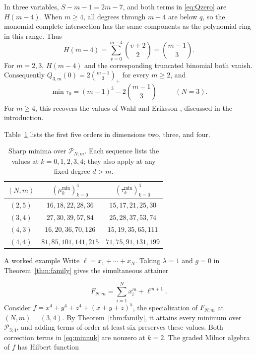 \documentclass[12pt,reqno]{amsart}
\makeatletter
\renewcommand\subsection{\@startsection{subsection}{2}%
  \z@{.8\linespacing\@plus.3\linespacing}{.35\linespacing}%
  {\normalfont\bfseries}}
\newcommand{\tbin}[2]{\binom{#1}{#2}_{\!+}}
\newcommand{\Pall}{\mathcal P_{N;m}}
\theoremstyle{definition}
\makeatother
\begin{document}
In three variables, $S-m-1=2m-7$, and both terms in
\eqref{eq:Qzero} are $H(m-4)$. When $m\geq4$, all degrees through
$m-4$ are below $q$, so the monomial complete intersection has
the same components as the polynomial ring in this range. Thus
\[
 H(m-4)=\sum_{v=0}^{m-4}\binom{v+2}{2}=\binom{m-1}{3}.
\]
For $m=2,3$, $H(m-4)$ and the corresponding truncated binomial
both vanish. Consequently $Q_{3,m}(0)=2\tbin{m-1}{3}$ for every $m\geq2$,
and
\begin{equation}\label{eq:surface}
 \min\tau_0=(m-1)^3-2\tbin{m-1}{3}\qquad(N=3).
\end{equation}
For $m\geq4$, this recovers the values of Wahl and Eriksson
\cite[Example~4.7]{Wahl},
\cite[Theorem~2.2 and Proposition~3.2]{Eriksson} discussed in the
introduction.

 
Table~\ref{tab:examples} lists the first five orders in dimensions two,
three, and four.


\begin{table}[ht]
\centering
\renewcommand{\arraystretch}{1.15}
\caption{Sharp minima over $\Pall$. Each sequence lists the
values at $k=0,1,2,3,4$; they also apply at any fixed degree $d>m$.}
\label{tab:examples}
\begin{tabular}{ccc}
\toprule
$(N,m)$ & $(\mu_k^{\min})_{k=0}^4$ & $(\tau_k^{\min})_{k=0}^4$\\
\midrule
$(2,5)$ & $16,18,22,28,36$ & $15,17,21,25,30$\\
$(3,4)$ & $27,30,39,57,84$ & $25,28,37,53,74$\\
$(4,3)$ & $16,20,36,70,126$ & $15,19,35,65,111$\\
$(4,4)$ & $81,85,101,141,215$ & $71,75,91,131,199$\\
\bottomrule
\end{tabular}
\end{table}
\FloatBarrier

\subsection{A worked example}
Write $\ell=x_1+\cdots+x_N$. Taking $\lambda=1$ and $g=0$ in
Theorem~\ref{thm:family} gives the simultaneous attainer

\begin{equation}\label{eq:unrestrictedattainer}
 F_{N;m}=\sum_{i=1}^N x_i^m+\ell^{m+1}.
\end{equation}
Consider $f=x^4+y^4+z^4+(x+y+z)^5$, the specialization of $F_{N;m}$
at $(N,m)=(3,4)$. By Theorem~\ref{thm:family}, it attains every minimum
over $\mathcal P_{3;4}$, and adding terms of order at least six preserves
these values. Both correction terms in \eqref{eq:minnuk} are nonzero at
$k=2$. The graded Milnor algebra of $f$ has Hilbert function
\end{document}

